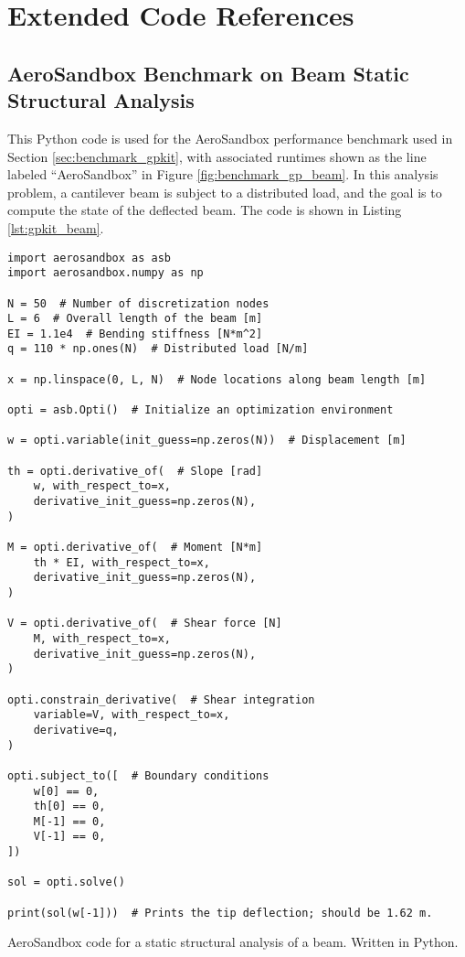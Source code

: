 \chapter{Extended Code References}
\label{chap:code}


\section{AeroSandbox Benchmark on Beam Static Structural Analysis}

This Python code is used for the AeroSandbox performance benchmark used in Section \ref{sec:benchmark_gpkit}, with associated runtimes shown as the line labeled ``AeroSandbox'' in Figure \ref{fig:benchmark_gp_beam}. In this analysis problem, a cantilever beam is subject to a distributed load, and the goal is to compute the state of the deflected beam. The code is shown in Listing \ref{lst:gpkit_beam}.

\begin{listing}[h]
    \begin{verbatim}
import aerosandbox as asb
import aerosandbox.numpy as np

N = 50  # Number of discretization nodes
L = 6  # Overall length of the beam [m]
EI = 1.1e4  # Bending stiffness [N*m^2]
q = 110 * np.ones(N)  # Distributed load [N/m]

x = np.linspace(0, L, N)  # Node locations along beam length [m]

opti = asb.Opti()  # Initialize an optimization environment

w = opti.variable(init_guess=np.zeros(N))  # Displacement [m]

th = opti.derivative_of(  # Slope [rad]
    w, with_respect_to=x,
    derivative_init_guess=np.zeros(N),
)

M = opti.derivative_of(  # Moment [N*m]
    th * EI, with_respect_to=x,
    derivative_init_guess=np.zeros(N),
)

V = opti.derivative_of(  # Shear force [N]
    M, with_respect_to=x,
    derivative_init_guess=np.zeros(N),
)

opti.constrain_derivative(  # Shear integration
    variable=V, with_respect_to=x,
    derivative=q,
)

opti.subject_to([  # Boundary conditions
    w[0] == 0,
    th[0] == 0,
    M[-1] == 0,
    V[-1] == 0,
])

sol = opti.solve()

print(sol(w[-1]))  # Prints the tip deflection; should be 1.62 m.
    \end{verbatim}
    \caption{AeroSandbox code for a static structural analysis of a beam. Written in Python.}
    \label{lst:gpkit_beam}
\end{listing}

